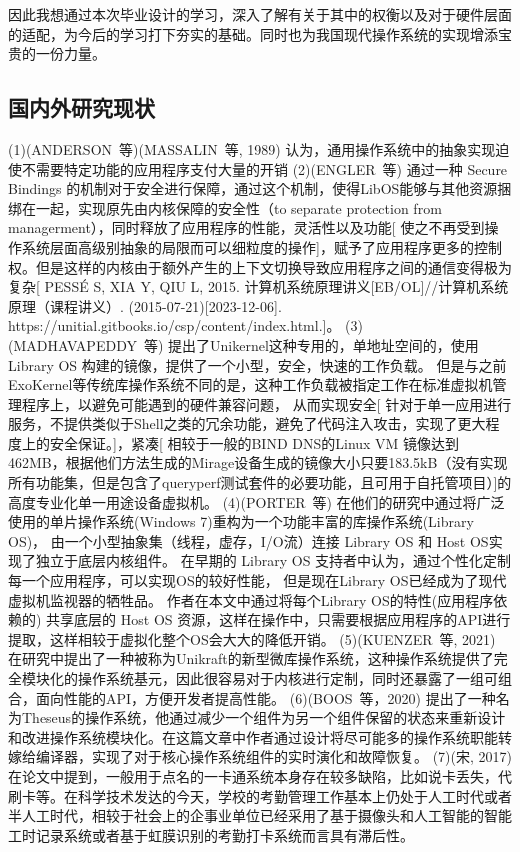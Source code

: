 因此我想通过本次毕业设计的学习，深入了解有关于其中的权衡以及对于硬件层面的适配，为今后的学习打下夯实的基础。同时也为我国现代操作系统的实现增添宝贵的一份力量。

\subsection{国内外研究现状}

(1)(ANDERSON 等)(MASSALIN 等, 1989) 认为，通用操作系统中的抽象实现迫使不需要特定功能的应用程序支付大量的开销
(2)(ENGLER 等) 通过一种 Secure Bindings 的机制对于安全进行保障，通过这个机制，使得LibOS能够与其他资源捆绑在一起，实现原先由内核保障的安全性（to separate protection from managerment），同时释放了应用程序的性能，灵活性以及功能[ 使之不再受到操作系统层面高级别抽象的局限而可以细粒度的操作]，赋予了应用程序更多的控制权。但是这样的内核由于额外产生的上下文切换导致应用程序之间的通信变得极为复杂[ PESSÉ S, XIA Y, QIU L, 2015. 计算机系统原理讲义[EB/OL]//计算机系统原理（课程讲义）. (2015-07-21)[2023-12-06]. https://unitial.gitbooks.io/csp/content/index.html.]。
(3)(MADHAVAPEDDY 等) 提出了Unikernel这种专用的，单地址空间的，使用Library OS 构建的镜像，提供了一个小型，安全，快速的工作负载。
但是与之前ExoKernel等传统库操作系统不同的是，这种工作负载被指定工作在标准虚拟机管理程序上，以避免可能遇到的硬件兼容问题，
从而实现安全[ 针对于单一应用进行服务，不提供类似于Shell之类的冗余功能，避免了代码注入攻击，实现了更大程度上的安全保证。]，紧凑[ 相较于一般的BIND DNS的Linux VM 镜像达到462MB，根据他们方法生成的Mirage设备生成的镜像大小只要183.5kB（没有实现所有功能集，但是包含了queryperf测试套件的必要功能，且可用于自托管项目）]的高度专业化单一用途设备虚拟机。
(4)(PORTER 等) 在他们的研究中通过将广泛使用的单片操作系统(Windows 7)重构为一个功能丰富的库操作系统(Library OS)，
由一个小型抽象集（线程，虚存，I/O流）连接 Library OS 和 Host OS实现了独立于底层内核组件。
在早期的 Library OS 支持者中认为，通过个性化定制每一个应用程序，可以实现OS的较好性能，
但是现在Library OS已经成为了现代虚拟机监视器的牺牲品。 作者在本文中通过将每个Library OS的特性(应用程序依赖的) 共享底层的 Host OS 资源，这样在操作中，只需要根据应用程序的API进行提取，这样相较于虚拟化整个OS会大大的降低开销。
(5)(KUENZER 等, 2021) 在研究中提出了一种被称为Unikraft的新型微库操作系统，这种操作系统提供了完全模块化的操作系统基元，因此很容易对于内核进行定制，同时还暴露了一组可组合，面向性能的API，方便开发者提高性能。
(6)(BOOS 等，2020) 提出了一种名为Theseus的操作系统，他通过减少一个组件为另一个组件保留的状态来重新设计和改进操作系统模块化。在这篇文章中作者通过设计将尽可能多的操作系统职能转嫁给编译器，实现了对于核心操作系统组件的实时演化和故障恢复。
(7)(宋, 2017)在论文中提到，一般用于点名的一卡通系统本身存在较多缺陷，比如说卡丢失，代刷卡等。在科学技术发达的今天，学校的考勤管理工作基本上仍处于人工时代或者半人工时代，相较于社会上的企事业单位已经采用了基于摄像头和人工智能的智能工时记录系统或者基于虹膜识别的考勤打卡系统而言具有滞后性。

